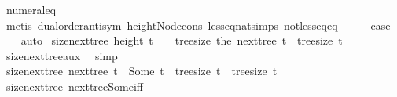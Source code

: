 \begin{isabellebody}
\ numeral{\isacharunderscore}{\kern0pt}{}{\isacharunderscore}{\kern0pt}eq{\isacharunderscore}{\kern0pt}{}\isanewline
\ \ \ \ \isamarkupfalse%
\ {\isacharparenleft}{\kern0pt}metis\ dual{\isacharunderscore}{\kern0pt}order{\isachardot}{\kern0pt}antisym\ height{\isacharunderscore}{\kern0pt}Node{\isacharunderscore}{\kern0pt}cons\ less{\isacharunderscore}{\kern0pt}eq{\isacharunderscore}{\kern0pt}nat{\isachardot}{\kern0pt}simps{\isacharparenleft}{\kern0pt}{}{\isacharparenright}{\kern0pt}\ not{\isacharunderscore}{\kern0pt}less{\isacharunderscore}{\kern0pt}eq{\isacharunderscore}{\kern0pt}eq{\isacharparenright}{\kern0pt}\isanewline
\ \ \isamarkupfalse%
\ \isamarkupfalse%
\ {\isacharquery}{\kern0pt}case\ \isamarkupfalse%
\ {}\ \isamarkupfalse%
\ auto\isanewline
{}\isamarkupfalse%
%
\endisatagproof
{\isafoldproof}%
%
\isadelimproof
\isanewline
%
\endisadelimproof
\isanewline
{}\isamarkupfalse%
\ size{\isacharunderscore}{\kern0pt}next{\isacharunderscore}{\kern0pt}tree{\isacharcolon}{\kern0pt}\ {\isachardoublequoteopen}height\ t\ {\isasymge}\ {}\ {\isasymLongrightarrow}\ tree{\isacharunderscore}{\kern0pt}size\ {\isacharparenleft}{\kern0pt}the\ {\isacharparenleft}{\kern0pt}next{\isacharunderscore}{\kern0pt}tree\ t{\isacharparenright}{\kern0pt}{\isacharparenright}{\kern0pt}\ {\isacharequal}{\kern0pt}\ tree{\isacharunderscore}{\kern0pt}size\ t{\isachardoublequoteclose}\isanewline
%
\isadelimproof
\ \ %
\endisadelimproof
%
\isatagproof
{}\isamarkupfalse%
\ size{\isacharunderscore}{\kern0pt}next{\isacharunderscore}{\kern0pt}tree{\isacharunderscore}{\kern0pt}aux\ \isamarkupfalse%
\ simp%
\endisatagproof
{\isafoldproof}%
%
\isadelimproof
\isanewline
%
\endisadelimproof
\isanewline
{}\isamarkupfalse%
\ size{\isacharunderscore}{\kern0pt}next{\isacharunderscore}{\kern0pt}tree{\isacharprime}{\kern0pt}{\isacharcolon}{\kern0pt}\ {\isachardoublequoteopen}next{\isacharunderscore}{\kern0pt}tree\ t\ {\isacharequal}{\kern0pt}\ Some\ t{\isacharprime}{\kern0pt}\ {\isasymLongrightarrow}\ tree{\isacharunderscore}{\kern0pt}size\ t{\isacharprime}{\kern0pt}\ {\isacharequal}{\kern0pt}\ tree{\isacharunderscore}{\kern0pt}size\ t{\isachardoublequoteclose}\isanewline
%
\isadelimproof
\ \ %
\endisadelimproof
%
\isatagproof
{}\isamarkupfalse%
\ size{\isacharunderscore}{\kern0pt}next{\isacharunderscore}{\kern0pt}tree\ next{\isacharunderscore}{\kern0pt}tree{\isacharunderscore}{\kern0pt}Some{\isacharunderscore}{\kern0pt}iff\ \isamarkupfalse%

\end{isabellebody}
